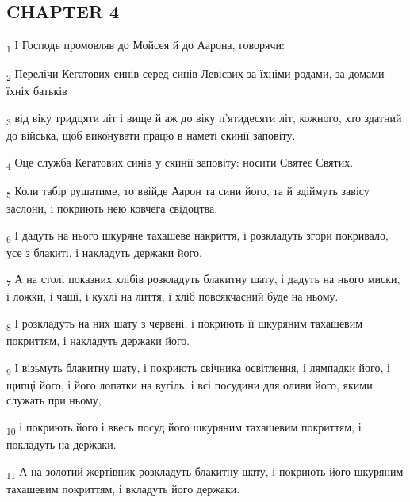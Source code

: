 \subsection{CHAPTER 4}
\begin{tcolorbox}
\textsubscript{1} І Господь промовляв до Мойсея й до Аарона, говорячи:
\end{tcolorbox}
\begin{tcolorbox}
\textsubscript{2} Перелічи Кегатових синів серед синів Левієвих за їхніми родами, за домами їхніх батьків
\end{tcolorbox}
\begin{tcolorbox}
\textsubscript{3} від віку тридцяти літ і вище й аж до віку п'ятидесяти літ, кожного, хто здатний до війська, щоб виконувати працю в наметі скинії заповіту.
\end{tcolorbox}
\begin{tcolorbox}
\textsubscript{4} Оце служба Кегатових синів у скинії заповіту: носити Святеє Святих.
\end{tcolorbox}
\begin{tcolorbox}
\textsubscript{5} Коли табір рушатиме, то ввійде Аарон та сини його, та й здіймуть завісу заслони, і покриють нею ковчега свідоцтва.
\end{tcolorbox}
\begin{tcolorbox}
\textsubscript{6} І дадуть на нього шкуряне тахашеве накриття, і розкладуть згори покривало, усе з блакиті, і накладуть держаки його.
\end{tcolorbox}
\begin{tcolorbox}
\textsubscript{7} А на столі показних хлібів розкладуть блакитну шату, і дадуть на нього миски, і ложки, і чаші, і кухлі на лиття, і хліб повсякчасний буде на ньому.
\end{tcolorbox}
\begin{tcolorbox}
\textsubscript{8} І розкладуть на них шату з червені, і покриють її шкуряним тахашевим покриттям, і накладуть держаки його.
\end{tcolorbox}
\begin{tcolorbox}
\textsubscript{9} І візьмуть блакитну шату, і покриють свічника освітлення, і лямпадки його, і щипці його, і його лопатки на вугіль, і всі посудини для оливи його, якими служать при ньому,
\end{tcolorbox}
\begin{tcolorbox}
\textsubscript{10} і покриють його і ввесь посуд його шкуряним тахашевим покриттям, і покладуть на держаки.
\end{tcolorbox}
\begin{tcolorbox}
\textsubscript{11} А на золотий жертівник розкладуть блакитну шату, і покриють його шкуряним тахашевим покриттям, і вкладуть його держаки.
\end{tcolorbox}
